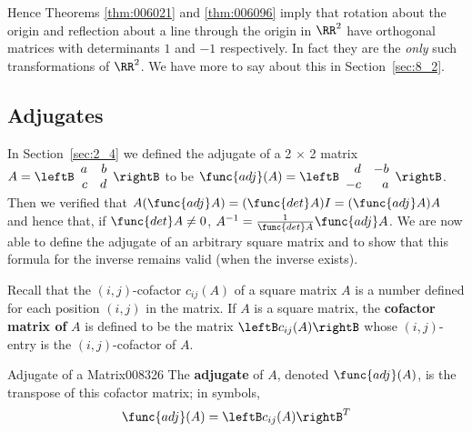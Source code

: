 Hence Theorems \ref{thm:006021} and \ref{thm:006096} imply that rotation about the origin and reflection about a line through the origin in $\RR^2$ have orthogonal matrices with determinants $1$ and $-1$ respectively. In fact they are the \textit{only} such transformations of  $\RR^2$. We have more to say about this in Section~\ref{sec:8_2}.


\subsection*{Adjugates}

In Section~\ref{sec:2_4} we defined the adjugate of a 2 $\times$ 2 matrix $A = \leftB \begin{array}{rr}
a & b \\
c & d 
\end{array} \rightB$ 
 to be $\func{adj} (A) = \leftB \begin{array}{rr}
d & -b \\
-c & a 
\end{array} \rightB$.
 Then we verified that $A (\func{adj } A) = (\func{det } A)I = (\func{adj } A)A$ and hence that, if $\func{det} A \neq 0$, $A^{-1} = \frac{1}{\func{det } A} \func{adj } A$. We are now able to define the adjugate of an arbitrary square matrix 
and to show that this formula for the inverse remains valid (when the 
inverse exists).


Recall that the $(i, j)$-cofactor $c_{ij}(A)$ of a square matrix $A$ is a number defined for each position $(i, j)$ in the matrix. If $A$ is a square matrix, the \textbf{cofactor matrix of} $A$ is defined to be the matrix $\leftB c_{ij}(A)\rightB$ whose $(i, j)$-entry is the $(i, j)$-cofactor of $A$. 


\begin{definition}{Adjugate of a Matrix}{008326}
The \textbf{adjugate}\footnotemark
of $A$, denoted $\func{adj }(A)$, is the transpose of this cofactor matrix; in symbols,
\begin{equation*}
\func{adj}(A) = \leftB c_{ij}(A) \rightB^T
\end{equation*}
\end{definition}

